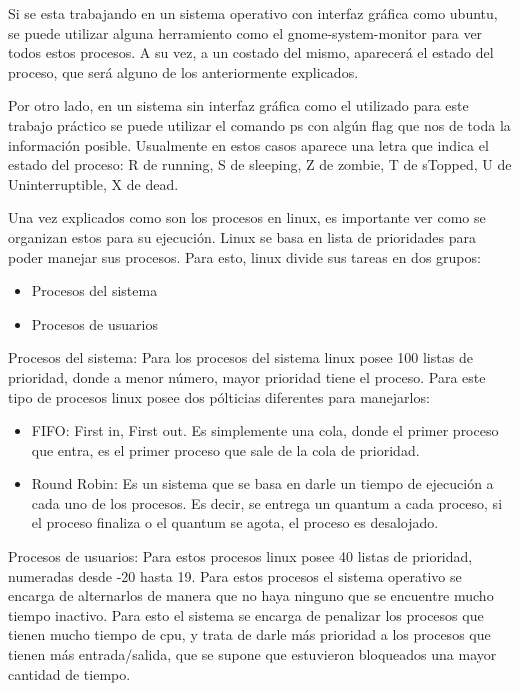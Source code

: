 \documentclass[a4paper, 12pt]{article}
\begin{document}
Si se esta trabajando en un sistema operativo con interfaz gr\'afica como ubuntu, se puede utilizar alguna herramiento como el gnome-system-monitor para ver todos estos procesos. A su vez, a un costado del mismo, aparecer\'a el estado del proceso, que ser\'a alguno de los anteriormente explicados.

Por otro lado, en un sistema sin interfaz gr\'afica como el utilizado para este trabajo pr\'actico se puede utilizar el comando ps con alg\'un flag que nos de toda la informaci\'on posible. Usualmente en estos casos aparece una letra que indica el estado del proceso: R de running, S de sleeping, Z de zombie, T de sTopped, U de Uninterruptible, X de dead.

\bigskip

Una vez explicados como son los procesos en linux, es importante ver como se organizan estos para su ejecuci\'on. Linux se basa en lista de prioridades para poder manejar sus procesos. Para esto, linux divide sus tareas en dos grupos:

\begin{itemize}
\item Procesos del sistema
\item Procesos de usuarios
\end{itemize}

Procesos del sistema: Para los procesos del sistema linux posee 100 listas de prioridad, donde a menor n\'umero, mayor prioridad tiene el proceso. Para este tipo de procesos linux posee dos p\'olticias diferentes para manejarlos: 
\begin{itemize}
\item FIFO: First in, First out. Es simplemente una cola, donde el primer proceso que entra, es el primer proceso que sale de la cola de prioridad. 
\item Round Robin: Es un sistema que se basa en darle un tiempo de ejecuci\'on a cada uno de los procesos. Es decir, se entrega un quantum a cada proceso, si el proceso finaliza o el quantum se agota, el proceso es desalojado.
\end{itemize}

Procesos de usuarios:
Para estos procesos linux posee 40 listas de prioridad, numeradas desde -20 hasta 19. Para estos procesos el sistema operativo se encarga de alternarlos de manera que no haya ninguno que se encuentre mucho tiempo inactivo. Para esto el sistema se encarga de penalizar los procesos que tienen mucho tiempo de cpu, y trata de darle m\'as prioridad a los procesos que tienen m\'as entrada/salida, que se supone que estuvieron bloqueados una mayor cantidad de tiempo.
\end{document}
